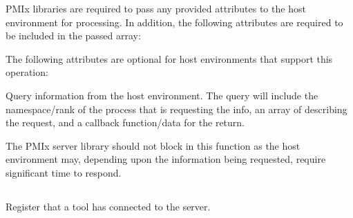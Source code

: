 \reqattrstart
\ac{PMIx} libraries are required to pass any provided attributes to the host environment for processing. In addition, the following attributes are required to be included in the passed  array:


\reqattrend


\optattrstart
The following attributes are optional for host environments that support this operation:


\optattrend
\descr

Query information from the host environment.
The query will include the namespace/rank of the process that is requesting the info, an array of  describing the request, and a callback function/data for the return.

\adviceimplstart
The \ac{PMIx} server library should not block in this function as the host environment may, depending upon the information being requested, require significant time to respond.
\adviceimplend


\subsection{}

\summary

Register that a tool has connected to the server.

\format


